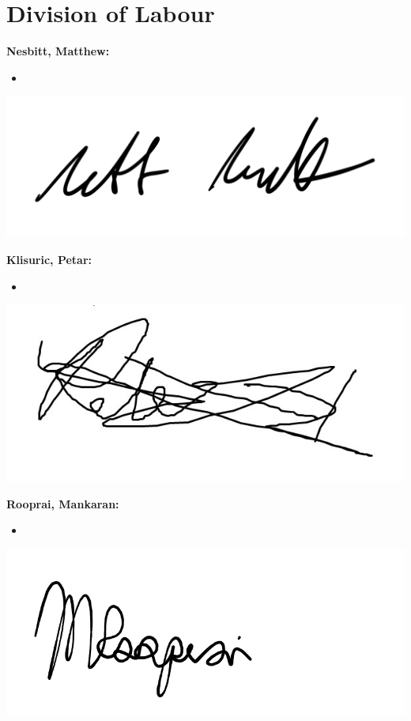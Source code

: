 \documentclass[]{article}
\begin{document}
\appendix
\section{Division of Labour}
\label{sec:division_of_labour}
\textbf{Nesbitt, Matthew:}
\begin{itemize}
    \item
\end{itemize}
\includegraphics[scale=0.15]{mattsignature.jpg}

\textbf{Klisuric, Petar:}
\begin{itemize}
  \item   
\end{itemize}
\includegraphics[scale=0.15]{petarsignature.jpg}

\textbf{Rooprai, Mankaran:}
\begin{itemize}
    \item
\end{itemize}
\includegraphics[scale=0.15]{mankaransignature.png}
\end{document}
